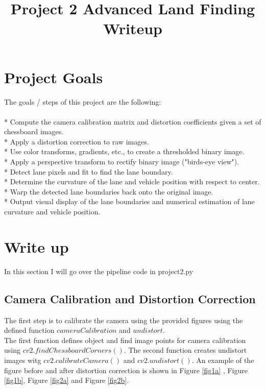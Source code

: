 \documentclass{article}
\title{Project 2 Advanced Land Finding Writeup}
\begin{document}
\maketitle
\section{Project Goals}

The goals / steps of this project are the following:\\\\
* Compute the camera calibration matrix and distortion coefficients given a set of chessboard images.\\
* Apply a distortion correction to raw images.\\
* Use color transforms, gradients, etc., to create a thresholded binary image.\\
* Apply a perspective transform to rectify binary image ("birds-eye view").\\
* Detect lane pixels and fit to find the lane boundary.\\
* Determine the curvature of the lane and vehicle position with respect to center.\\
* Warp the detected lane boundaries back onto the original image.\\
* Output visual display of the lane boundaries and numerical estimation of lane curvature and vehicle position.\\

\section{Write up}
In this section I will go over the pipeline code in project2.py
\subsection{Camera Calibration and Distortion Correction} 
The first step is to calibrate the camera using the provided figures using the defined function $cameraCalibration$ and $undistort$. \\
The first function defines object and find image points for camera calibration using $cv2.findChessboardCorners()$. The second function creates undistort images witg $cv2.calibrateCamera()$ and $cv2.undistort()$. An example of the figure before and after distortion correction is shown in Figure \ref{fig1a} , Figure \ref{fig1b}, Figure \ref{fig2a} and Figure \ref{fig2b}.
\end{document}
